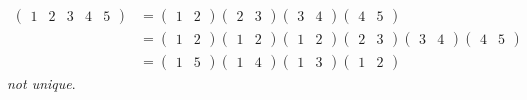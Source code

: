 \begin{example} ~\vspace*{-1.5\baselineskip}
\begin{align*}
    \begin{pmatrix}1 & 2 & 3 & 4 & 5\end{pmatrix} &= \begin{pmatrix}1 & 2\end{pmatrix} \begin{pmatrix}2 & 3\end{pmatrix} \begin{pmatrix}3 & 4\end{pmatrix} \begin{pmatrix}4 & 5\end{pmatrix} \\
    &= \begin{pmatrix}1 & 2\end{pmatrix} \begin{pmatrix}1 & 2\end{pmatrix} \begin{pmatrix}1 & 2\end{pmatrix} \begin{pmatrix}2 & 3\end{pmatrix} \begin{pmatrix}3 & 4\end{pmatrix} \begin{pmatrix}4 & 5\end{pmatrix} \\
    &= \begin{pmatrix}1 & 5\end{pmatrix} \begin{pmatrix}1 & 4\end{pmatrix} \begin{pmatrix}1 & 3\end{pmatrix} \begin{pmatrix}1 & 2\end{pmatrix}
\end{align*}
\emph{not unique}.
\end{example}


